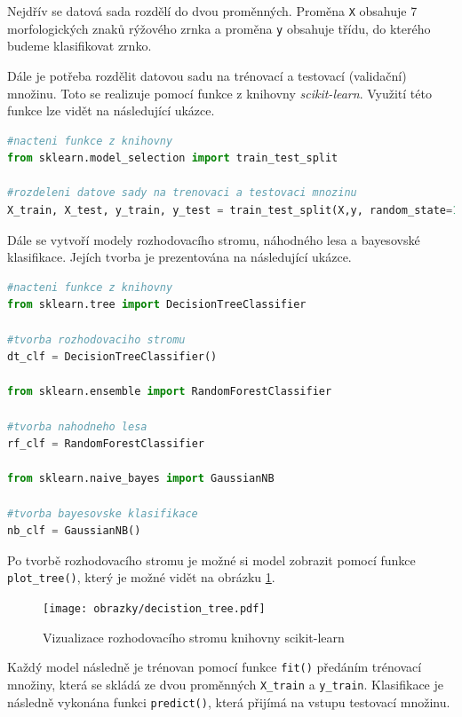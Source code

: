 Nejdřív se datová sada rozdělí do dvou proměnných. Proměna \verb|X| obsahuje 7 morfologických znaků rýžového zrnka a proměna \verb|y| obsahuje třídu, do kterého budeme klasifikovat zrnko. 

Dále je potřeba rozdělit datovou sadu na trénovací a testovací (validační) množinu. Toto se realizuje pomocí funkce z knihovny \textit{scikit-learn}. Využití této funkce lze vidět na následující ukázce. 

\begin{mdframed}
\begin{lstlisting}[language=Python]
#nacteni funkce z knihovny
from sklearn.model_selection import train_test_split

#rozdeleni datove sady na trenovaci a testovaci mnozinu
X_train, X_test, y_train, y_test = train_test_split(X,y, random_state=14)
\end{lstlisting}   
\end{mdframed}

Dále se vytvoří modely rozhodovacího stromu, náhodného lesa a bayesovské klasifikace. Jejích tvorba je prezentována na následující ukázce. 


\begin{mdframed}
\begin{lstlisting}[language=Python]
#nacteni funkce z knihovny
from sklearn.tree import DecisionTreeClassifier

#tvorba rozhodovaciho stromu
dt_clf = DecisionTreeClassifier()

from sklearn.ensemble import RandomForestClassifier

#tvorba nahodneho lesa
rf_clf = RandomForestClassifier

from sklearn.naive_bayes import GaussianNB

#tvorba bayesovske klasifikace
nb_clf = GaussianNB()
\end{lstlisting}   
\end{mdframed}

Po tvorbě rozhodovacího stromu je možné si model zobrazit pomocí funkce \verb|plot_tree()|, který je možné vidět na obrázku \ref{strom-scikit}.

\begin{figure}[h]\centering
  \centering
  \texttt{[image: obrazky/decistion\_tree.pdf]}\\[1pt]
  \caption{Vizualizace rozhodovacího stromu knihovny scikit-learn}
  \label{strom-scikit}
\end{figure}

Každý model následně je trénovan pomocí funkce \verb|fit()| předáním trénovací množiny, která se skládá ze dvou proměnných \verb|X_train| a \verb|y_train|. Klasifikace je následně vykonána funkci \verb|predict()|, která přijímá na vstupu testovací množinu. 

